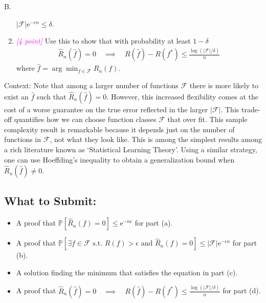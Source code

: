 \documentclass{article}
\newcommand{\1}{\mathbf{1}}
\renewcommand{\P}{\mathbb{P}}
\providecommand*{\eu}{\ensuremath{\mathrm{e}}}
\newcommand{\points}[1]{\small\textcolor{magenta}{\emph{[#1 point\ifthenelse{\equal{#1}{1}}{}{s}]}} \normalsize}
\newcounter{bprob}
\newenvironment{bprob}[1][]{\begin{mdframed} \refstepcounter{bprob}\par\medskip
  B\thebprob.#1 }
   { \end{mdframed} }
\begin{document}
\begin{bprob}
\begin{enumerate}
$\lvert \mathcal{F}\rvert \eu^{-\epsilon n} \le \delta$. 
\item \points{4} Use this to show that with probability at least $1-\delta$ 
\begin{align*}
    \widehat{R}_n(\widehat{f})=0 \quad \implies \quad  R(\widehat f) - R\left(f^*\right) \leq \frac{\log(\lvert\mathcal{F}\rvert/\delta)}{n}
\end{align*}
where $\widehat f = \arg\min_{f\in\mathcal{F}} \widehat R_n(f)$.
\end{enumerate}
Context: 
Note that among a larger number of functions $\mathcal{F}$ there is more likely to exist an $\widehat{f}$ such that $\widehat{R}_n(\widehat{f})=0$. 
However, this increased flexibility comes at the cost of a worse guarantee on the true error reflected in the larger $\lvert \mathcal{F}\rvert$. This trade-off quantifies how we can choose function classes $\mathcal{F}$ that over fit.
This sample complexity result is remarkable because it depends just on the number of functions in $\mathcal{F}$, not what they look like. This is among the simplest results among a rich literature known as `Statistical Learning Theory'.
Using a similar strategy, one can use Hoeffding's inequality to obtain a generalization bound when $\widehat{R}_n(\widehat{f}) \neq 0$.

\subsection*{What to Submit:}

\begin{itemize}
    \item A proof that $\P\left[ \widehat{R}_n(f) = 0 \right] \leq \eu^{-n \epsilon}$ for part (a).
    \item A proof that $\P \left[\exists f \in \mathcal{F}\text{ s.t. } R(f) > \epsilon \text{ and }  \widehat{R}_n(f) = 0 \right] \le \lvert\mathcal{F}\rvert \eu^{-\epsilon n}$ for part (b).
    \item A solution finding the minimum that satisfies the equation in part (c).
    \item A proof that $\widehat{R}_n(\widehat{f})=0 \quad \implies \quad  R(\widehat f) - R\left(f^*\right) \leq \frac{\log(\lvert\mathcal{F}\rvert/\delta)}{n}$ for part (d).
\end{itemize}


\end{bprob}
\end{document}
